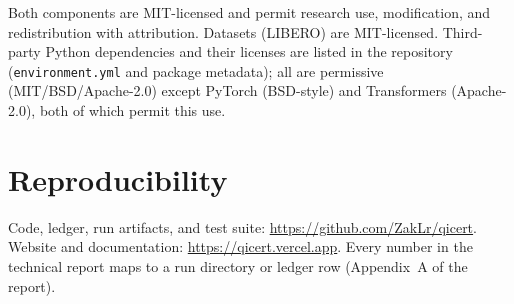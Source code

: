 \documentclass[10pt]{article}
\begin{document}
\medskip
Both components are MIT-licensed and permit research use, modification,
and redistribution with attribution. Datasets (LIBERO) are MIT-licensed.
Third-party Python dependencies and their licenses are listed in the
repository (\texttt{environment.yml} and package metadata); all are
permissive (MIT/BSD/Apache-2.0) except PyTorch (BSD-style) and
Transformers (Apache-2.0), both of which permit this use.

\section{Reproducibility}

Code, ledger, run artifacts, and test suite: \url{https://github.com/ZakLr/qicert}.
Website and documentation: \url{https://qicert.vercel.app}.
Every number in the technical report maps to a run directory or ledger row
(Appendix~A of the report).
\end{document}

